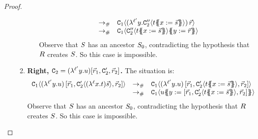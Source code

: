 \begin{proof}
\begin{enumerate}
\begin{enumerate}
\begin{enumerate}
\[\begin{array}{rcl}
        & \todist &
        \con_1\of{(\lamp{\labtwo}{\vartwo}{\con''_2\of{ \tm\sub{\var}{\ls{\tmtwo}} }})\,\ls{\tmfour}}
        \\
        & \todist &
        \con_1\of{\con''_2\of{ \tm\sub{\var}{\ls{\tmtwo}} }\sub{\vartwo}{\ls{\tmfour}}}
        \end{array}
      \]
      Observe that $S$ has an ancestor $S_0$, contradicting the hypothesis that $R$ creates $S$.
      So this case is impossible.
    \end{enumerate}
  \item {\bf Right, $\mathtt{C}_2 = (\lambda^{\ell'} y. u)[\vec{r}_1,\mathtt{C}'_2,\vec{r}_2]$.}
    The situation is:
    \[
      \begin{array}{rcl}
      \con_1\of{(\lamp{\labtwo}{\vartwo}{\tmthree})\,[\ls{\tmfour}_1,\con'_2\of{(\lamp{\lab}{\var}{\tm})\ls{\tmtwo}},\ls{\tmfour}_2]}
      & \todist &
      \con_1\of{(\lamp{\labtwo}{\vartwo}{\tmthree})\,[\ls{\tmfour}_1,\con'_2\of{\tm\sub{\var}{\ls{\tmtwo}}},\ls{\tmfour}_2]}
      \\
      & \todist &
      \con_1\of{\tmthree\sub{\vartwo}{[\ls{\tmfour}_1,\con'_2\of{\tm\sub{\var}{\ls{\tmtwo}}},\ls{\tmfour}_2]}}
      \end{array}
    \]
    Observe that $S$ has an ancestor $S_0$, contradicting the hypothesis that $R$ creates $S$.
    So this case is impossible.
  \end{enumerate}
\end{enumerate}
\end{proof}

